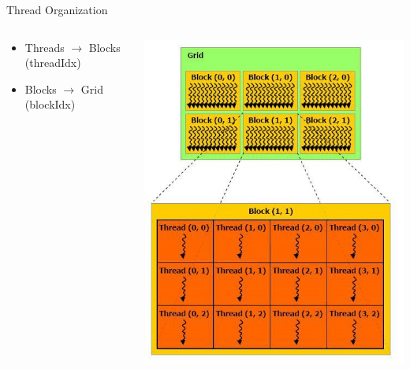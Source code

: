 \documentclass[xcolor=svgnames]{beamer}
\begin{document}
\begin{frame}{Thread Organization}
 \begin{columns}
  \begin{column}{0.5\textwidth}
   \begin{itemize}
    \item Threads $\rightarrow$ Blocks (threadIdx)
    \item Blocks $\rightarrow$ Grid (blockIdx)
   \end{itemize}
  \end{column}
  
  \begin{column}{0.5\textwidth}
   \includegraphics[width=\textwidth]
{images/Maths_Project_Presentation_gridofthreadblocks.JPG}
  \end{column}
 \end{columns}
\end{frame}
\end{document}
